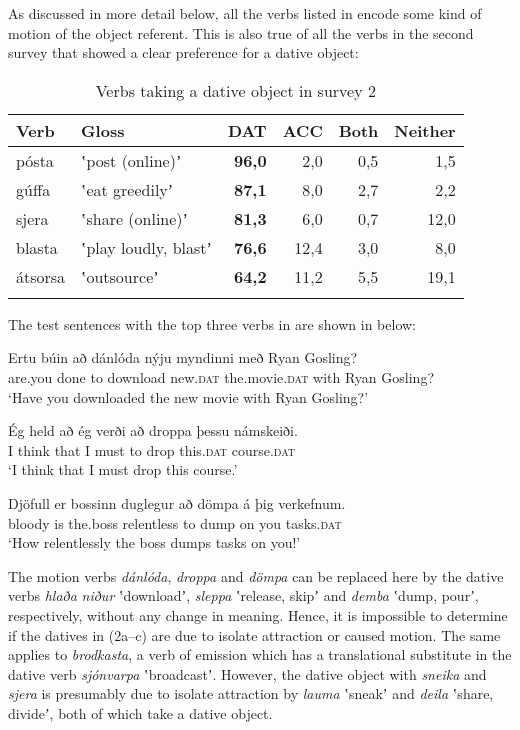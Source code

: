 \documentclass[output=paper,modfonts,nonflat,colorlinks,citecolor=brown]{langsci/langscibook}
\begin{document}
As discussed in more detail below, all the verbs listed in  encode some kind of motion of the object referent. This is also true of all the verbs in the second survey that showed a clear preference for a dative object:

\begin{table}
{\caption{\label{tab:jonsson:2}Verbs taking a dative object in survey 2}}
\begin{tabularx}{\textwidth}{XXrrrr}
\lsptoprule
Verb & Gloss & \textbf{DAT} & ACC & Both & Neither\\
\midrule
pósta & ʽpost (online)ʼ & \textbf{96,0} & 2,0 & 0,5 & 1,5\\
gúffa & ʽeat greedilyʼ & \textbf{87,1} & 8,0 & 2,7 & 2,2\\
sjera & ʽshare (online)ʼ & \textbf{81,3} & 6,0 & 0,7 & 12,0\\
blasta & ʽplay loudly, blastʼ & \textbf{76,6} & 12,4 & 3,0 & 8,0\\
átsorsa & ʽoutsourceʼ & \textbf{64,2} & 11,2 & 5,5 & 19,1\\
\lspbottomrule
\end{tabularx}
\end{table}

The test sentences with the top three verbs in  are shown in  below:


\ea%
    \label{ex:jonsson:2}

\ea
\gll  Ertu  búin  að  dánlóda  nýju  myndinni  með  Ryan  Gosling?\\
   are.you  done  to  download  new.\textsc{dat}  the.movie.\textsc{dat}  with  Ryan  Gosling?\\
\glt `Have you downloaded the new movie with Ryan Gosling?'


\ex
\gll   Ég  held  að  ég  verði  að  droppa  þessu  námskeiði.\\
 I  think  that  I  must  to  drop  this.\textsc{dat}  course.\textsc{dat}\\
\glt `I think that I must drop this course.'


\ex
\gll   Djöfull  er  bossinn  duglegur  að  dömpa  á  þig  verkefnum.\\
 bloody  is  the.boss  relentless  to  dump  on  you  tasks.\textsc{dat}\\
\glt `How relentlessly the boss dumps tasks on you!'
\z
\z

The motion verbs \textit{dánlóda}, \textit{droppa} and \textit{dömpa} can be replaced here by the dative verbs \textit{hlaða} \textit{niður} ʽdownloadʼ, \textit{sleppa} ʽrelease, skipʼ and \textit{demba} ʽdump, pourʼ, respectively, without any change in meaning.\textstyleFootnoteSymbol{} Hence, it is impossible to determine if the datives in (2a--c) are due to isolate attraction or caused motion. The same applies to \textit{brodkasta}, a verb of emission which has a translational substitute in the dative verb \textit{sjónvarpa} ʽbroadcastʼ. However, the dative object with \textit{sneika} and \textit{sjera} is presumably due to isolate attraction by \textit{lauma} ʽsneakʼ and \textit{deila} ʽshare, divideʼ, both of which take a dative object.
\end{document}
